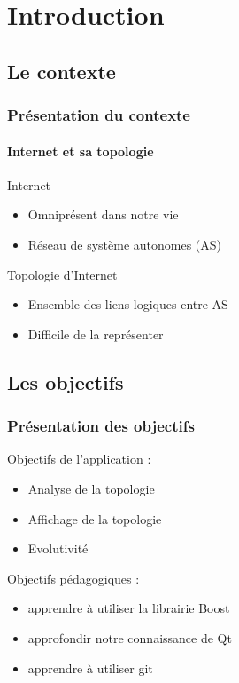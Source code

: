 \section*{Introduction}

\subsection*{Le contexte}
\frame
{
\frametitle{Pr\'esentation du contexte}
\framesubtitle{Internet et sa topologie}
\vfill
\begin{block}{Internet}
\begin{itemize}
\item Omnipr\'esent dans notre vie
\item  R\'eseau de système autonomes (AS)
\end{itemize}
\end{block}
\vfill
\begin{block}{Topologie d'Internet}
\begin{itemize}
\item Ensemble des liens logiques entre AS
\item Difficile de la repr\'esenter
\end{itemize}
\end{block}
\vfill
}

\subsection*{Les objectifs}
\frame
{
\frametitle{Pr\'esentation des objectifs}
Objectifs de l'application :
\begin{itemize}
 \item Analyse de la topologie
 \item Affichage de la topologie
 \item Evolutivit\'e
\end{itemize}

Objectifs p\'edagogiques :
\begin{itemize}
 \item apprendre \`a utiliser la librairie Boost
 \item approfondir notre connaissance de Qt
 \item apprendre \`a utiliser git
\end{itemize}

}
